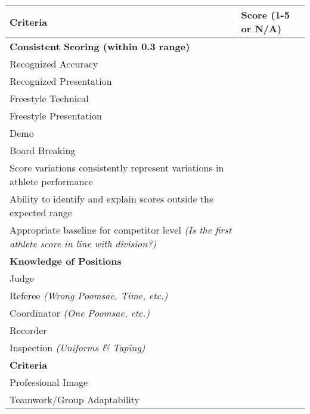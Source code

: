 \documentclass[10pt]{article}
\begin{document}
\begin{center}
    \setlength\extrarowheight{3pt}

    \begin{tabular}{|M{0.85\textwidth}|C{0.10\textwidth}|}
        \hline
        \textbf{\Large Criteria} & \textbf{Score (1-5 or N/A)} \\ \hline

        \textbf{Consistent Scoring (within 0.3 range)} &  \\ \hline
        Recognized Accuracy & \\ \hline
        Recognized Presentation & \\ \hline
        Freestyle Technical & \\ \hline
        Freestyle Presentation & \\ \hline
        Demo & \\ \hline
        Board Breaking & \\ \hline
        Score variations consistently represent variations in athlete performance & \\ \hline
        Ability to identify and explain scores outside the expected range & \\ \hline
        Appropriate baseline for competitor level \textit{(Is the first athlete score in line with division?)} & \\ \hline

        \textbf{Knowledge of Positions} &  \\ \hline
        Judge & \\ \hline
        Referee \textit{(Wrong Poomsae, Time, etc.)} & \\ \hline
        Coordinator \textit{(One Poomsae, etc.)} & \\ \hline
        Recorder & \\ \hline
        Inspection \textit{(Uniforms \& Taping)} & \\ \hline

        \textbf{Criteria} &  \\ \hline
        Professional Image & \\ \hline
        Teamwork/Group Adaptability & \\ \hline
    \end{tabular}


\end{center}
\end{document}
